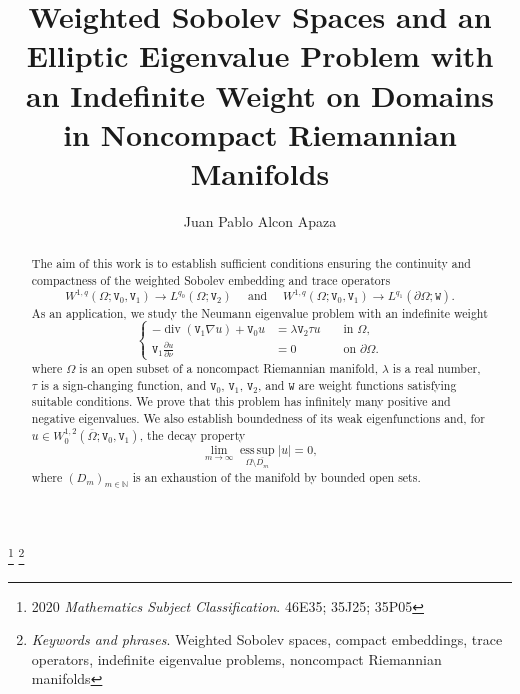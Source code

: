 \documentclass[reqno, 11pt, a4paper]{amsart}
\title{{Weighted Sobolev Spaces and an Elliptic Eigenvalue Problem
with an Indefinite Weight on Domains in Noncompact Riemannian Manifolds}}
\author{Juan Pablo Alcon Apaza}
\numberwithin{equation}{section}
\newcommand{\iwe}{ \tau}
\newcommand{\wghtv}{\mathtt{V}}
\newcommand{\wghtw}{\mathtt{W}}
\newcommand{\qxp}{q}
\begin{document}
\maketitle
\begin{abstract} The aim of this work is to establish sufficient conditions ensuring
the continuity and compactness of the weighted Sobolev embedding and trace operators $$ W^{1,\qxp}(\Omega; \wghtv_0, \wghtv_1) \rightarrow L^{\qxp_0}(\Omega; \wghtv_2) \quad \text { and } \quad W^{1,\qxp}(\Omega; \wghtv_0, \wghtv_1) \rightarrow L^{\qxp_1}(\partial \Omega; \wghtw).$$ As an application, we study the Neumann eigenvalue problem with an indefinite weight \begin{equation*}\left\{\begin{aligned}-\operatorname{div} ( \wghtv _1 \nabla u )+ \wghtv _0 u   & = \lambda \wghtv _2 \iwe u  & & \text { in } \Omega,\\\wghtv _1 \frac{\partial u}{\partial \nu} &= 0 & & \text { on } \partial \Omega .\end{aligned}\right.\end{equation*} where $\Omega$ is an open subset of a noncompact Riemannian manifold, $\lambda$ is a real number, $\iwe$ is a sign-changing function, and $\wghtv _0$, $\wghtv _1$, \(\wghtv_2\), and \(\wghtw\) are weight functions satisfying suitable conditions.  We prove that this problem has infinitely many positive and negative eigenvalues. We also establish boundedness of its weak eigenfunctions and, for $u\in W^{1,2}_0(\overline{\Omega};\wghtv_0,\wghtv_1)$, the decay property  $$\lim_{m\rightarrow\infty}\operatorname*{ess\,sup}_{\Omega\setminus\overline{D_m}}|u|=0,$$ where $(D_m)_{m\in\mathbb N}$ is an exhaustion of the manifold by bounded open sets.\end{abstract}




\let\thefootnote\relax\footnote{2020 \textit{Mathematics Subject Classification}.  {46E35; 35J25; 35P05}}
\let\thefootnote\relax\footnote{\textit{Keywords and phrases}. Weighted Sobolev spaces, compact embeddings, trace operators, indefinite eigenvalue problems, noncompact Riemannian manifolds}


\end{document}
